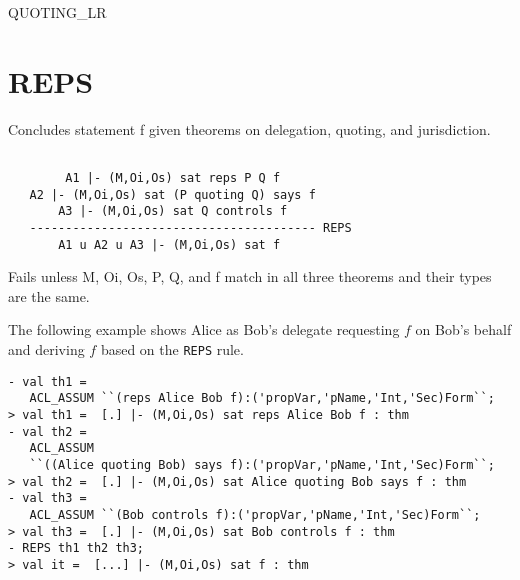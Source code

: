 \SEEALSO
QUOTING\_LR
\ENDDOC

\section{REPS}




\egroup

\SYNOPSIS
Concludes statement f given theorems on delegation, quoting, and 
jurisdiction.

\DESCRIBE
\begin{verbatim}

        A1 |- (M,Oi,Os) sat reps P Q f  
   A2 |- (M,Oi,Os) sat (P quoting Q) says f
       A3 |- (M,Oi,Os) sat Q controls f
   ---------------------------------------- REPS
       A1 u A2 u A3 |- (M,Oi,Os) sat f
\end{verbatim}

\FAILURE 
Fails unless M, Oi, Os, P, Q, and f match in all three
theorems and their types are the same.  

\EXAMPLE The following example shows Alice as Bob's delegate
requesting $f$ on Bob's behalf and deriving $f$ based on the
\texttt{REPS} rule.
\begin{holboxed}
\begin{verbatim}
- val th1 = 
   ACL_ASSUM ``(reps Alice Bob f):('propVar,'pName,'Int,'Sec)Form``;
> val th1 =  [.] |- (M,Oi,Os) sat reps Alice Bob f : thm
- val th2 = 
   ACL_ASSUM 
   ``((Alice quoting Bob) says f):('propVar,'pName,'Int,'Sec)Form``;
> val th2 =  [.] |- (M,Oi,Os) sat Alice quoting Bob says f : thm
- val th3 = 
   ACL_ASSUM ``(Bob controls f):('propVar,'pName,'Int,'Sec)Form``;
> val th3 =  [.] |- (M,Oi,Os) sat Bob controls f : thm
- REPS th1 th2 th3;
> val it =  [...] |- (M,Oi,Os) sat f : thm
\end{verbatim}
\end{holboxed}

